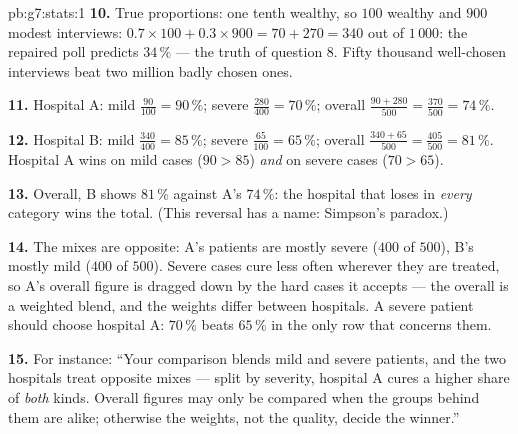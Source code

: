 \begin{solution}{pb:g7:stats:1}
\textbf{10.} True proportions: one tenth wealthy, so $100$
wealthy and $900$ modest interviews:
$0.7 \times 100 + 0.3 \times 900 = 70 + 270 = 340$ out of
$1\,000$: the repaired poll predicts $34\,\%$ --- the truth of
question 8. Fifty thousand well-chosen interviews beat two
million badly chosen ones.

\textbf{11.} Hospital A: mild $\frac{90}{100} = 90\,\%$; severe
$\frac{280}{400} = 70\,\%$; overall
$\frac{90 + 280}{500} = \frac{370}{500} = 74\,\%$.

\textbf{12.} Hospital B: mild $\frac{340}{400} = 85\,\%$;
severe $\frac{65}{100} = 65\,\%$; overall
$\frac{340 + 65}{500} = \frac{405}{500} = 81\,\%$. Hospital A
wins on mild cases ($90 > 85$) \emph{and} on severe cases
($70 > 65$).

\textbf{13.} Overall, B shows $81\,\%$ against A's $74\,\%$:
the hospital that loses in \emph{every} category wins the
total. (This reversal has a name: Simpson's paradox.)

\textbf{14.} The mixes are opposite: A's patients are mostly
severe ($400$ of $500$), B's mostly mild ($400$ of $500$).
Severe cases cure less often wherever they are treated, so A's
overall figure is dragged down by the hard cases it accepts ---
the overall is a weighted blend, and the weights differ between
hospitals. A severe patient should choose hospital A: $70\,\%$
beats $65\,\%$ in the only row that concerns them.

\textbf{15.} For instance: ``Your comparison blends mild and
severe patients, and the two hospitals treat opposite mixes ---
split by severity, hospital A cures a higher share of
\emph{both} kinds. Overall figures may only be compared when the
groups behind them are alike; otherwise the weights, not the
quality, decide the winner.''
\end{solution}
